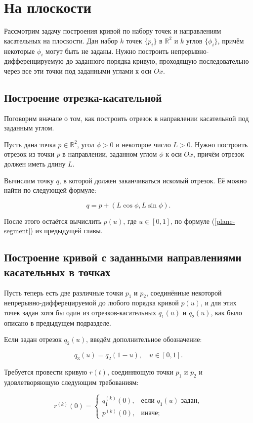 \section{На плоскости}

Рассмотрим задачу построения кривой по набору точек и направлениям касательных на плоскости. Дан набор $k$ точек
$\{p_i\}$ в $\mathbb{R}^2$ и $k$ углов $\{\phi_i\}$, причём некоторые $\phi_i$ могут быть не заданы. Нужно построить
непрерывно-дифференцируемую до заданного порядка кривую, проходящую последовательно через все эти точки под заданными
углами к оси $Ox$.

\subsection*{Построение отрезка-касательной}

Поговорим вначале о том, как построить отрезок в направлении касательной под заданным углом.

Пусть дана точка $p \in \mathbb{R}^2$, угол $\phi>0$ и некоторое число $L>0$. Нужно построить отрезок из точки $p$
в направлении, заданном углом $\phi$ к оси $Ox$, причём отрезок должен иметь длину $L$.

Вычислим точку $q$, в которой должен заканчиваться искомый отрезок. Её можно найти по следующей формуле:

$$
q=p+(L\cos\phi,L\sin\phi).
$$

После этого остаётся вычислить $p(u)$, где $u \in [0,1]$, по формуле (\ref{plane-segment}) из предыдущей главы.

\subsection*{Построение кривой с заданными направлениями \mbox{касательных} в точках}

Пусть теперь есть две различные точки $p_1$ и $p_2$, соединённые некоторой непрерыв\-но-дифферецируемой до любого
порядка кривой $p(u)$, и для этих точек задан хотя бы один из отрезков-касательных $q_1(u)$ и $q_2(u)$, как было описано
в предыдущем подразделе.

Если задан отрезок $q_2(u)$, введём дополнительное обозначение:

$$
q_3(u)=q_2(1-u), \quad u \in [0,1].
$$

Требуется провести кривую $r(t)$, соединяющую точки $p_1$ и $p_2$ и удовлетворяющую следующим требованиям:

\begin{equation*}
r^{(k)}(0)=
  \begin{cases}
    q_1^{(k)}(0), & \text{если $q_1(u)$ задан}, \\
    p^{(k)}(0),   & \text{иначе};
  \end{cases}
\end{equation*}

